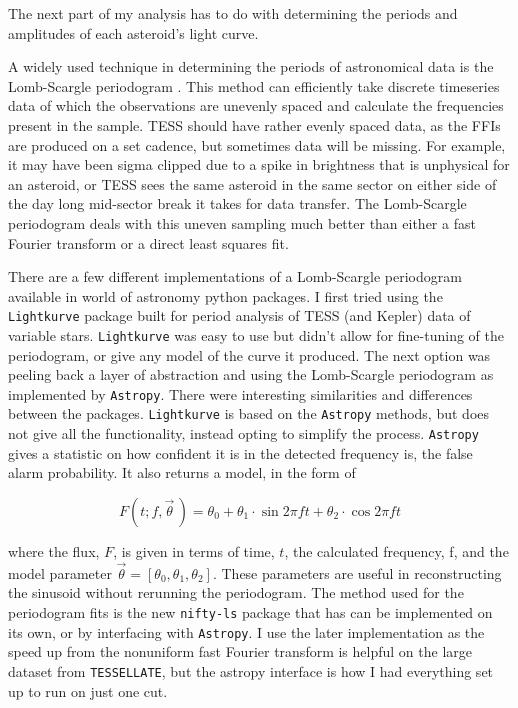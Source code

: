 \documentclass{UCreport}
\begin{document}

The next part of my analysis has to do with determining the periods and amplitudes of each asteroid's light curve.

A widely used technique in determining the periods of astronomical data is the Lomb-Scargle periodogram \citep[\citet{Lomb1976,Scargle1982}, but see][for a review]{VanderPlas2018}.
This method can efficiently take discrete timeseries data of which the observations are unevenly spaced and calculate the frequencies present in the sample.
TESS should have rather evenly spaced data, as the FFIs are produced on a set cadence, but sometimes data will be missing.
For example, it may have been sigma clipped due to a spike in brightness that is unphysical for an asteroid, or TESS sees the same asteroid in the same sector on either side of the day long mid-sector break it takes for data transfer.
The Lomb-Scargle periodogram deals with this uneven sampling much better than either a fast Fourier transform or a direct least squares fit.

There are a few different implementations of a Lomb-Scargle periodogram available in world of astronomy python packages.
I first tried using the \texttt{Lightkurve} \citep{Lightkurve2018} package built for period analysis of TESS (and Kepler) data of variable stars.
\texttt{Lightkurve} was easy to use but didn't allow for fine-tuning of the periodogram, or give any model of the curve it produced.
The next option was peeling back a layer of abstraction and using the Lomb-Scargle periodogram as implemented by \texttt{Astropy}\citep[\citet{Astropy2022} but see][for the implementation]{Vanderplas2012,Vanderplas2015}.
There were interesting similarities and differences between the packages.
\texttt{Lightkurve} is based on the \texttt{Astropy} methods, but does not give all the functionality, instead opting to simplify the process.
\texttt{Astropy} gives a statistic on how confident it is in the detected frequency is, the false alarm probability.
It also returns a model, in the form of

\begin{equation}
  \label{Eq:LCModel}
  F(t;f,\vec{\theta}\,) = \theta_0 + \theta_1\cdot\sin{2\pi ft} +\theta_2\cdot\cos{2\pi ft}
\end{equation}

where the flux, $F$, is given in terms of time, $t$, the calculated frequency, f, and the model parameter $\vec{\theta} = [\theta_0, \theta_1,\theta_2]$.
These parameters are useful in reconstructing the sinusoid without rerunning the periodogram.
The method used for the periodogram fits is the new \texttt{nifty-ls} package \citep{Garrison2024} that has can be implemented on its own, or by interfacing with \texttt{Astropy}.
I use the later implementation as the speed up from the nonuniform fast Fourier transform is helpful on the large dataset from \texttt{TESSELLATE}, but the astropy interface is how I had everything set up to run on just one cut.
\end{document}
